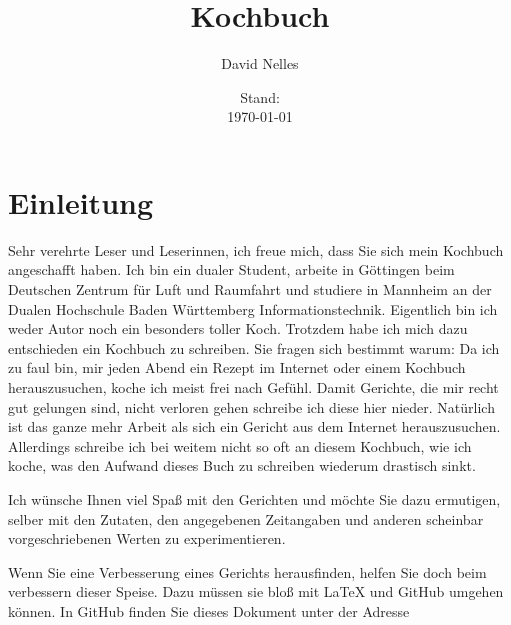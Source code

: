 \documentclass[12pt,a4paper,titlepage,parskip]{scrartcl}
\author{David Nelles}
\title{Kochbuch}
\date{Stand: \\ \today}
\begin{document}
	\maketitle
	\section{Einleitung}
	Sehr verehrte Leser und Leserinnen, ich freue mich, dass Sie sich mein Kochbuch angeschafft haben. Ich bin ein dualer Student, arbeite in Göttingen beim Deutschen Zentrum für Luft und Raumfahrt und studiere in Mannheim an der Dualen Hochschule Baden Württemberg Informationstechnik. Eigentlich bin ich weder Autor noch ein besonders toller Koch. Trotzdem habe ich mich dazu entschieden ein Kochbuch zu schreiben. Sie fragen sich bestimmt warum: Da ich zu faul bin, mir jeden Abend ein Rezept im Internet oder einem Kochbuch herauszusuchen, koche ich meist frei nach Gefühl. Damit Gerichte, die mir recht gut gelungen sind, nicht verloren gehen schreibe ich diese hier nieder. Natürlich ist das ganze mehr Arbeit als sich ein Gericht aus dem Internet herauszusuchen. Allerdings schreibe ich bei weitem nicht so oft an diesem Kochbuch, wie ich koche, was den Aufwand dieses Buch zu schreiben wiederum drastisch sinkt.
	
	Ich wünsche Ihnen viel Spaß mit den Gerichten und möchte Sie dazu ermutigen, selber mit den Zutaten, den angegebenen Zeitangaben und anderen scheinbar vorgeschriebenen Werten zu experimentieren.
	
	Wenn Sie eine Verbesserung eines Gerichts herausfinden, helfen Sie doch beim verbessern dieser Speise. Dazu müssen sie bloß mit LaTeX und GitHub umgehen können. In GitHub finden Sie dieses Dokument unter der Adresse
\end{document}
